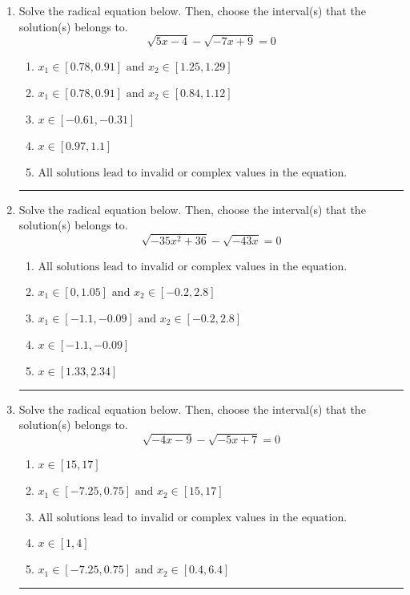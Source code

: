 \documentclass[14pt]{extbook}
\newcommand{\litem}[1]{\item#1\hspace*{-1cm}\rule{\textwidth}{0.4pt}}
\begin{document}
\begin{enumerate}
{\begin{enumerate}[label=\Alph*.]
\end{enumerate} }
\litem{
Solve the radical equation below. Then, choose the interval(s) that the solution(s) belongs to.\[ \sqrt{5 x - 4} - \sqrt{-7 x + 9} = 0 \]\begin{enumerate}[label=\Alph*.]
\item \( x_1 \in [0.78, 0.91] \text{ and } x_2 \in [1.25,1.29] \)
\item \( x_1 \in [0.78, 0.91] \text{ and } x_2 \in [0.84,1.12] \)
\item \( x \in [-0.61,-0.31] \)
\item \( x \in [0.97,1.1] \)
\item \( \text{All solutions lead to invalid or complex values in the equation.} \)

\end{enumerate} }
\litem{
Solve the radical equation below. Then, choose the interval(s) that the solution(s) belongs to.\[ \sqrt{-35 x^2 + 36} - \sqrt{-43 x} = 0 \]\begin{enumerate}[label=\Alph*.]
\item \( \text{All solutions lead to invalid or complex values in the equation.} \)
\item \( x_1 \in [0, 1.05] \text{ and } x_2 \in [-0.2,2.8] \)
\item \( x_1 \in [-1.1, -0.09] \text{ and } x_2 \in [-0.2,2.8] \)
\item \( x \in [-1.1,-0.09] \)
\item \( x \in [1.33,2.34] \)

\end{enumerate} }
\litem{
Solve the radical equation below. Then, choose the interval(s) that the solution(s) belongs to.\[ \sqrt{-4 x - 9} - \sqrt{-5 x + 7} = 0 \]\begin{enumerate}[label=\Alph*.]
\item \( x \in [15,17] \)
\item \( x_1 \in [-7.25, 0.75] \text{ and } x_2 \in [15,17] \)
\item \( \text{All solutions lead to invalid or complex values in the equation.} \)
\item \( x \in [1,4] \)
\item \( x_1 \in [-7.25, 0.75] \text{ and } x_2 \in [0.4,6.4] \)


\end{enumerate}}
\end{enumerate}
\end{document}
